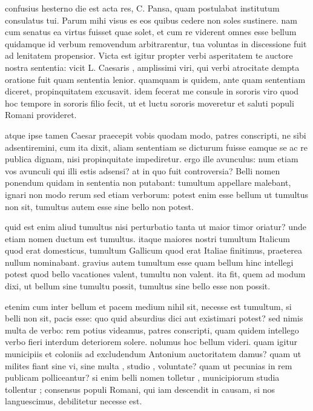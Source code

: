 
 confusius hesterno die est acta res, C. Pansa, quam postulabat institutum consulatus tui. Parum mihi visus es eos quibus cedere non soles sustinere. nam cum senatus ea virtus fuisset quae solet, et cum re viderent omnes esse bellum quidamque id verbum removendum arbitrarentur, tua voluntas in discessione fuit ad lenitatem propensior. Victa est igitur propter verbi asperitatem te auctore nostra sententia: vicit L. Caesaris , amplissimi viri, qui verbi atrocitate dempta oratione fuit quam sententia lenior. quamquam is quidem, ante quam sententiam diceret, propinquitatem excusavit. idem fecerat me consule in sororis viro quod hoc tempore in sororis filio fecit, ut et luctu sororis moveretur et saluti populi Romani provideret.

 atque ipse tamen Caesar praecepit vobis quodam modo, patres conscripti, ne sibi adsentiremini, cum ita dixit, aliam sententiam se dicturum fuisse eamque se ac re publica dignam, nisi propinquitate impediretur. ergo ille avunculus: num etiam vos avunculi qui illi estis adsensi? at in quo fuit controversia? Belli nomen ponendum quidam in sententia non putabant: tumultum appellare malebant, ignari non modo rerum sed etiam verborum: potest enim esse bellum ut tumultus non sit, tumultus autem esse sine bello non potest.

 quid est enim aliud tumultus nisi perturbatio tanta ut maior timor oriatur? unde etiam nomen ductum est tumultus. itaque maiores nostri tumultum Italicum quod erat domesticus, tumultum Gallicum quod erat Italiae finitimus, praeterea nullum nominabant. gravius autem tumultum esse quam bellum hinc intellegi potest quod bello vacationes valent, tumultu non valent. ita fit, quem ad modum dixi, ut bellum sine tumultu possit, tumultus sine bello esse non possit.

 etenim cum inter bellum et pacem medium nihil sit, necesse est tumultum, si belli non sit, pacis esse: quo quid absurdius dici aut existimari potest? sed nimis multa de verbo: rem potius videamus, patres conscripti, quam quidem intellego verbo fieri interdum deteriorem solere. nolumus hoc bellum videri. quam igitur municipiis et coloniis ad excludendum Antonium auctoritatem damus? quam ut milites fiant sine vi, sine multa , studio , voluntate? quam ut pecunias in rem publicam polliceantur? si enim belli nomen tolletur , municipiorum studia tollentur ; consensus populi Romani, qui iam descendit in causam, si nos languescimus, debilitetur necesse est.

